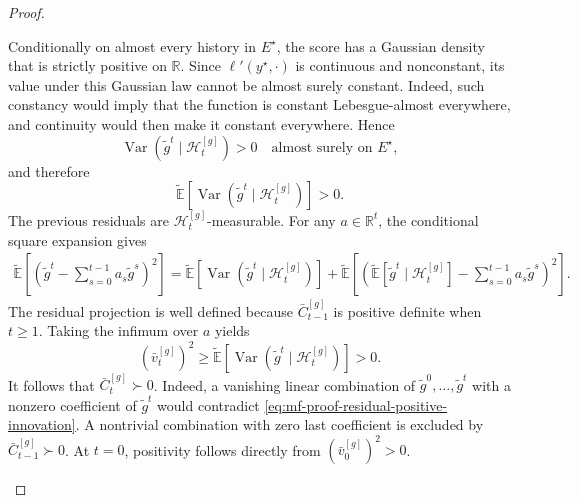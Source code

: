 \begin{proof}
\begin{enumerate}[wide]
\[            \]
            Conditionally on almost every history in $E^\star$,
            the score has a Gaussian density that is strictly positive
            on $\mathbb R$.
            Since $\ell'(y^\star,\cdot)$ is continuous and nonconstant,
            its value under this Gaussian law cannot be almost surely
            constant. Indeed, such constancy would imply that the
            function is constant Lebesgue-almost everywhere, and
            continuity would then make it constant everywhere.
            Hence
            \[
                \operatorname{Var}
                (\tilde g^t\mid\mathcal H_t^{[g]})>0
                \quad\text{almost surely on }E^\star,
            \]
            and therefore
            \[
                \tilde{\mathbb E}
                \left[
                    \operatorname{Var}
                    (\tilde g^t\mid\mathcal H_t^{[g]})
                \right]>0.
            \]
            The previous residuals are $\mathcal H_t^{[g]}$-measurable.
            For any $a\in\mathbb R^t$, the conditional square expansion
            gives
            \[
            \begin{aligned}
                \tilde{\mathbb E}
                \left[
                    \left(
                        \tilde g^t-\sum_{s=0}^{t-1}a_s\tilde g^s
                    \right)^2
                \right]
                =
                \tilde{\mathbb E}
                \left[
                    \operatorname{Var}
                    (\tilde g^t\mid\mathcal H_t^{[g]})
                \right]
                +
                \tilde{\mathbb E}
                \left[
                    \left(
                        \tilde{\mathbb E}
                        [\tilde g^t\mid\mathcal H_t^{[g]}]
                        -\sum_{s=0}^{t-1}a_s\tilde g^s
                    \right)^2
                \right].
            \end{aligned}
            \]
            The residual projection is well defined because
            $\bar C_{t-1}^{[g]}$ is positive definite when $t\geq1$.
            Taking the infimum over $a$ yields
            \begin{equation}
                (\bar v_t^{[g]})^2
                \geq
                \tilde{\mathbb E}
                \left[
                    \operatorname{Var}
                    (\tilde g^t\mid\mathcal H_t^{[g]})
                \right]
                >0.
                \label{eq:mf-proof-residual-positive-innovation}
            \end{equation}
            It follows that $\bar C_t^{[g]}\succ0$.
            Indeed, a vanishing linear combination of
            $\tilde g^0,\ldots,\tilde g^t$ with a nonzero coefficient
            of $\tilde g^t$ would contradict
            \eqref{eq:mf-proof-residual-positive-innovation}.
            A nontrivial combination with zero last coefficient
            is excluded by $\bar C_{t-1}^{[g]}\succ0$.
            At $t=0$, positivity follows directly from
            $(\bar v_0^{[g]})^2>0$.
        

\end{enumerate}
\end{proof}
